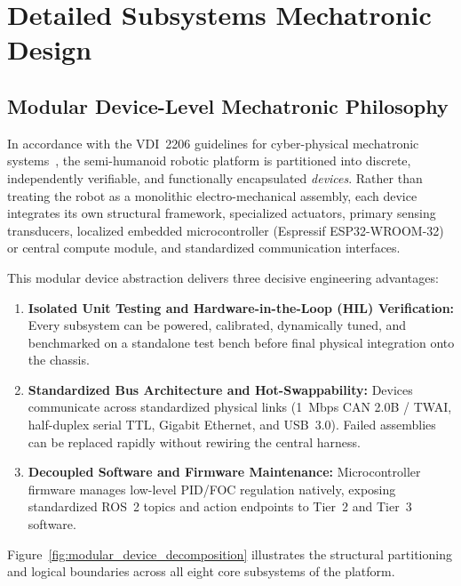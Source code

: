 \section{Detailed Subsystems Mechatronic Design}
\label{sec:subsystems_detail}

\subsection{Modular Device-Level Mechatronic Philosophy}
In accordance with the VDI~2206 guidelines for cyber-physical mechatronic systems~\cite{vdi2206}, the semi-humanoid robotic platform is partitioned into discrete, independently verifiable, and functionally encapsulated \emph{devices}. Rather than treating the robot as a monolithic electro-mechanical assembly, each device integrates its own structural framework, specialized actuators, primary sensing transducers, localized embedded microcontroller (Espressif ESP32-WROOM-32) or central compute module, and standardized communication interfaces.

This modular device abstraction delivers three decisive engineering advantages:
\begin{enumerate}[leftmargin=1.5em]
  \item \textbf{Isolated Unit Testing and Hardware-in-the-Loop (HIL) Verification:} Every subsystem can be powered, calibrated, dynamically tuned, and benchmarked on a standalone test bench before final physical integration onto the chassis.
  \item \textbf{Standardized Bus Architecture and Hot-Swappability:} Devices communicate across standardized physical links (1~Mbps CAN 2.0B / TWAI, half-duplex serial TTL, Gigabit Ethernet, and USB~3.0). Failed assemblies can be replaced rapidly without rewiring the central harness.
  \item \textbf{Decoupled Software and Firmware Maintenance:} Microcontroller firmware manages low-level PID/FOC regulation natively, exposing standardized ROS~2 topics and action endpoints to Tier~2 and Tier~3 software.
\end{enumerate}

Figure~\ref{fig:modular_device_decomposition} illustrates the structural partitioning and logical boundaries across all eight core subsystems of the platform.

